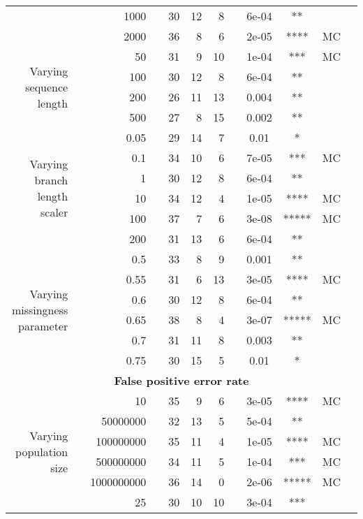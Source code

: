 \begin{table}[!h]
\begin{tabular}{r r r l r r r l c c c l}
   & & 1000 & & 30 & 12 & 8 & & 6e-04 & ** &  &  \\
   & & 2000 & & 36 & 8 & 6 & & 2e-05 & **** & MC &  \\
\midrule
\multirow{ 4}{2cm}{Varying sequence length}
   & & 50 & & 31 & 9 & 10 & & 1e-04 & *** & MC &  \\
   & & 100 & & 30 & 12 & 8 & & 6e-04 & ** &  &  \\
   & & 200 & & 26 & 11 & 13 & & 0.004 & ** &  &  \\
   & & 500 & & 27 & 8 & 15 & & 0.002 & ** &  &  \\
\midrule
\multirow{ 6}{2cm}{Varying branch length scaler}
   & & 0.05 & & 29 & 14 & 7 & & 0.01 & * &  &  \\
   & & 0.1 & & 34 & 10 & 6 & & 7e-05 & *** & MC &  \\
   & & 1 & & 30 & 12 & 8 & & 6e-04 & ** &  &  \\
   & & 10 & & 34 & 12 & 4 & & 1e-05 & **** & MC &  \\
   & & 100 & & 37 & 7 & 6 & & 3e-08 & ***** & MC &  \\
   & & 200 & & 31 & 13 & 6 & & 6e-04 & ** &  &  \\
\midrule
\multirow{ 6}{2cm}{Varying missingness parameter}
   & & 0.5 & & 33 & 8 & 9 & & 0.001 & ** &  &  \\
   & & 0.55 & & 31 & 6 & 13 & & 3e-05 & **** & MC &  \\
   & & 0.6 & & 30 & 12 & 8 & & 6e-04 & ** &  &  \\
   & & 0.65 & & 38 & 8 & 4 & & 3e-07 & ***** & MC &  \\
   & & 0.7 & & 31 & 11 & 8 & & 0.003 & ** &  &  \\
   & & 0.75 & & 30 & 15 & 5 & & 0.01 & * &  &  \\
\midrule
\multicolumn{12}{c}{\textbf{False positive error rate}} \\
\midrule
\multirow{ 6}{2cm}{Varying population size}
 & & 10 & & 35 & 9 & 6 & & 3e-05 & **** & MC &  \\
   & & 50000000 & & 32 & 13 & 5 & & 5e-04 & ** &  &  \\
   & & 100000000 & & 35 & 11 & 4 & & 1e-05 & **** & MC &  \\
   & & 500000000 & & 34 & 11 & 5 & & 1e-04 & *** & MC &  \\
   & & 1000000000 & & 36 & 14 & 0 & & 2e-06 & ***** & MC &  \\
\midrule
\multirow{ 6}{2cm}{Varying number of taxa}
   & & 25 & & 30 & 10 & 10 & & 3e-04 & *** &  &  \\

\end{tabular}
\end{table}
